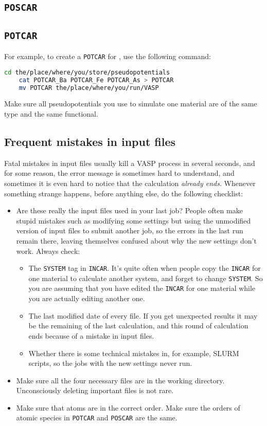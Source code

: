 \documentclass[hyperref, a4paper]{article}
\begin{document}
\subsection{\texttt{POSCAR}}

\subsection{\texttt{POTCAR}}

For example, to create a \texttt{POTCAR} for , use the following command:
\begin{lstlisting}[language=bash]
    cd the/place/where/you/store/pseudopotentials
    cat POTCAR_Ba POTCAR_Fe POTCAR_As > POTCAR
    mv POTCAR the/place/where/you/run/VASP 
\end{lstlisting}

Make sure all pseudopotentials you use to simulate one material are of the same type and the same functional.

\subsection{Frequent mistakes in input files}

Fatal mistakes in input files usually kill a VASP process in several seconds, and for some reason, the error message is sometimes hard to understand, and sometimes it is even hard to notice that the calculation \emph{already ends}.
Whenever something strange happens, before anything else, do the following checklist:
\begin{itemize}
    \item Are these really the input files used in your last job?
    People often make stupid mistakes such as modifying some settings but using the unmodified version of input files to submit another job, so the errors in the last run remain there, leaving themselves confused about why the new settings don't work.
    Always check:
    \begin{itemize}
        \item The \texttt{SYSTEM} tag in \texttt{INCAR}. It's quite often when people copy the \texttt{INCAR} for one material to calculate another system, and forget to change \texttt{SYSTEM}.
        So you are assuming that you have edited the \texttt{INCAR} for one material while you are actually editing another one.
        \item The last modified date of every file. If you get unexpected results it may be the remaining of the last calculation, and this round of calculation ends because of a mistake in input files.
        \item Whether there is some technical mistakes in, for example, SLURM scripts, so the jobs with the new settings never run. 
    \end{itemize} 
    \item Make sure all the four necessary files are in the working directory. Unconsciously deleting important files is not rare.
    \item Make sure that atoms are in the correct order. Make sure the orders of atomic species in \texttt{POTCAR} and \texttt{POSCAR} are the same.
\end{itemize}
\end{document}
